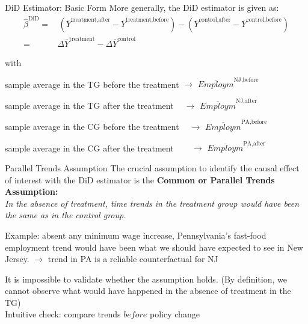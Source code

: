 \documentclass[11pt, aspectratio = 169]{beamer}
\let\svdescription\description
\let\svenddescription\enddescription
\renewenvironment{description}{%
  \svdescription%
  \let\svitem\item%
  \renewcommand\item[1][]{\svitem[\textcolor{\descriptioncolor}{##1}]}%
  }{
  \svenddescription%
  }
\newcommand\descriptioncolor{teal}
\begin{document}
\begin{frame}{DiD Estimator: Basic Form}
More generally, the DiD estimator is given as:
\begin{align*}
  \widehat{\beta}^{\text{DiD}} =& \, (\overline{Y}^{\text{treatment,after}} - \overline{Y}^{\text{treatment,before}}) - (\overline{Y}^{\text{control,after}} - \overline{Y}^{\text{control,before}}) \\
  =& \Delta \overline{Y}^{\text{treatment}} - \Delta \overline{Y}^{\text{control}} 
\end{align*}

with
\begin{description}
\item[$\overline{Y}^{\text{treatment,before}}$] sample average in the TG before the treatment \color{gray} $\rightarrow$ $\overline{Employm}^{\text{NJ,before}}$
\item[$\overline{Y}^{\text{treatment,after}}$] \color{black} sample average in the TG after the treatment \color{gray}
$\: \: \: \: \rightarrow$ $\overline{Employm}^{\text{NJ,after}}$
\item[$\overline{Y}^{\text{control,before}}$] \color{black} sample average in the CG before the treatment \color{gray} $\: \: \: \:  \rightarrow$ $\overline{Employm}^{\text{PA,before}}$
\item[$\overline{Y}^{\text{control,after}}$] \color{black} sample average in the CG after the treatment \color{gray} $\: \: \: \: \: \: \: \: \rightarrow$ $ \overline{Employm}^{\text{PA,after}}$
\end{description}
\end{frame}


\begin{frame}{Parallel Trends Assumption}
The crucial assumption to identify the causal effect of interest with the DiD estimator is the \alert{\textbf{Common or Parallel Trends Assumption:}}
\\
\textit{In the absence of treatment, time trends in the treatment group would have been the same as in the control group.}

\pause

Example: absent any minimum wage increase, Pennsylvania's fast-food employment trend would have been what we should have expected to see in New Jersey. $\rightarrow$ trend in PA is a reliable counterfactual for NJ

\pause

It is impossible to validate whether the assumption holds. (By definition, we cannot observe what would have happened in the absence of treatment in the TG) \\
Intuitive check: compare trends $before$ policy change

\end{frame}
\end{document}
